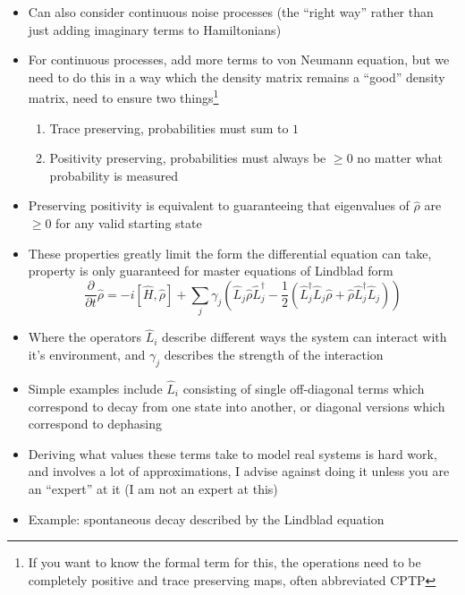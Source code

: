 \documentclass[english]{article}
\begin{document}
\begin{itemize}
\begin{itemize}
\begin{align}
\end{align}
\item Diagonal terms stay the same, but off-diagonal coherence terms are lost
\end{itemize} 
\item Can also consider continuous noise processes (the ``right way'' rather than just adding imaginary terms to Hamiltonians)
\item For continuous processes, add more terms to von Neumann equation, but we need to do this in a way which the density matrix remains a ``good'' density matrix, need to ensure two things\footnote{If you want to know the formal term for this, the operations need to be completely positive and trace preserving maps, often abbreviated CPTP}
\begin{enumerate}
\item Trace preserving, probabilities must sum to $1$
\item Positivity preserving, probabilities must always be $\ge 0$ no matter what probability is measured
\end{enumerate}
\item Preserving positivity is equivalent to guaranteeing that eigenvalues of $\hat{\rho}$ are $\ge 0$ for any valid starting state
\item These properties greatly limit the form the differential equation can take, property is only guaranteed for master equations of Lindblad form
\begin{equation}
\frac{\partial}{\partial t}\hat{\rho}=-i[\hat{H},\hat{\rho}]+\sum_{j}\gamma_{j}\left(\hat{L}_j\hat{\rho}\hat{L}^\dagger_j-\frac{1}{2}(\hat{L}^\dagger_j\hat{L}_j\hat{\rho}+\hat{\rho}\hat{L}^\dagger_j\hat{L}_j)\right) \label{Eq:Lindblad}
\end{equation}
\item Where the operators $\hat{L}_i$ describe different ways the system can interact with it's environment, and $\gamma_j$ describes the strength of the interaction
\item Simple examples include $\hat{L}_i$ consisting of single off-diagonal terms which correspond to decay from one state into another, or diagonal versions which correspond to dephasing
\item Deriving what values these terms take to model real systems is hard work, and involves a lot of approximations, I advise against doing it unless you are an ``expert'' at it (I am not an expert at this)
\item Example: spontaneous decay described by the Lindblad equation

\end{itemize}
\end{document}
